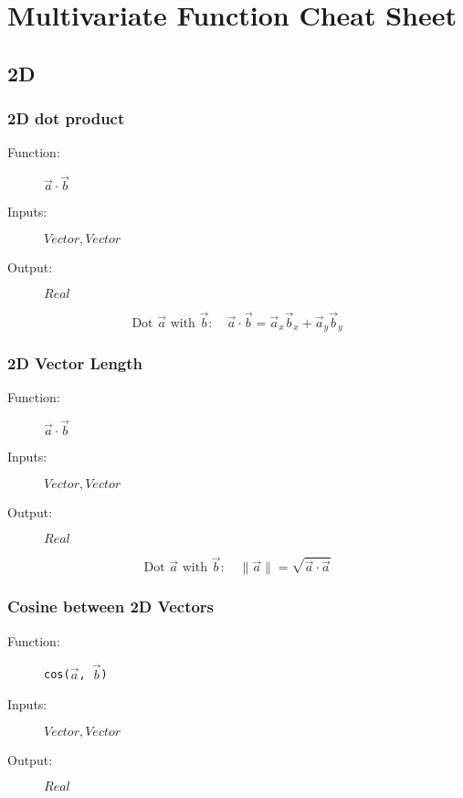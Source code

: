 \documentclass{article}
\begin{document}
\section{Multivariate Function Cheat Sheet}

\subsection{2D}

\subsubsection{2D dot product}

\begin{description}
\item[Function:] $\vec{a} \cdot \vec{b}$
\item[Inputs:] $Vector, Vector$
\item[Output:] $Real$
\end{description}

\[
\text{Dot } \vec{a} \text{ with } \vec{b} : \quad \vec{a} \cdot \vec{b} =
 \vec{a}_x \vec{b}_x  + \vec{a}_y \vec{b}_y
\]


\subsubsection{2D Vector Length}

\begin{description}
\item[Function:] $\vec{a} \cdot \vec{b}$
\item[Inputs:] $Vector, Vector$
\item[Output:] $Real$
\end{description}

\[
\text{Dot } \vec{a} \text{ with } \vec{b} : \quad \| \vec{a} \| =
 \sqrt{\vec{a} \cdot \vec{a}}
\]


\subsubsection{Cosine between 2D Vectors}

\begin{description}
\item[Function:] \texttt{cos(\(\vec{a}\), \(\vec{b}\))}
\item[Inputs:] $Vector, Vector$
\item[Output:] $Real$
\end{description}
\end{document}
